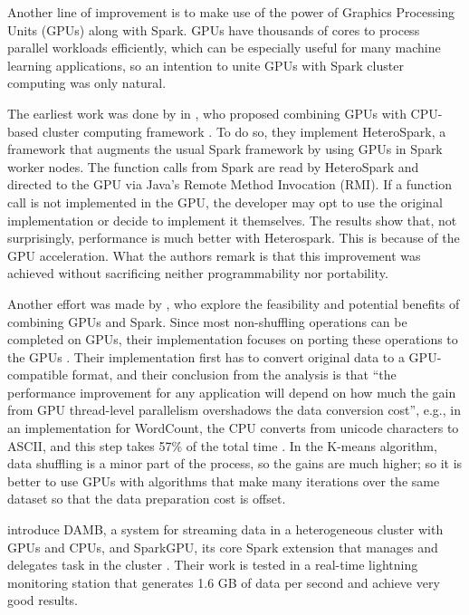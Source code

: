 \documentclass{article}
\begin{document}
Another line of improvement is to make use of the power of Graphics Processing Units (GPUs) along with Spark. GPUs have thousands of cores to process parallel workloads efficiently, which can be especially useful for many machine learning applications, so an intention to unite GPUs with Spark cluster computing was only natural.

The earliest work was done by \citeauthor{Li2015} in \citeyear{Li2015}, who proposed combining GPUs with CPU-based cluster computing framework \cite{Li2015}. To do so, they implement HeteroSpark, a framework that augments the usual Spark framework by using GPUs in Spark worker nodes. The function calls from Spark are read by HeteroSpark and directed to the GPU via Java's Remote Method Invocation (RMI). If a function call is not implemented in the GPU, the developer may opt to use the original implementation or decide to implement it themselves. The results show that, not surprisingly, performance is much better with Heterospark. This is because of the GPU acceleration. What the authors remark is that this improvement was achieved without sacrificing neither programmability nor portability.

Another effort was made by \citeauthor{Manzi2016}, who explore the feasibility and potential benefits of combining GPUs and Spark. Since most non-shuffling operations can be completed on GPUs, their implementation focuses on porting these operations to the GPUs \cite{Manzi2016}. Their implementation first has to convert original data to a GPU-compatible format, and their conclusion from the analysis is that ``the performance improvement for any application will depend on how much the gain from GPU thread-level parallelism overshadows the data conversion cost'', e.g., in an implementation for WordCount, the CPU converts from unicode characters to ASCII, and this step takes 57\% of the total time \cite{Manzi2016}. In the K-means algorithm, data shuffling is a minor part of the process, so the gains are much higher; so it is better to use GPUs with algorithms that make many iterations over the same dataset so that the data preparation cost is offset.

\citeauthor{Hassaan2016} introduce DAMB, a system for streaming data in a heterogeneous cluster with GPUs and CPUs, and SparkGPU, its core Spark extension that manages and delegates task in the cluster \cite{Hassaan2016}. Their work is tested in a real-time lightning monitoring station that generates 1.6 GB of data per second and achieve very good results. 
\end{document}
